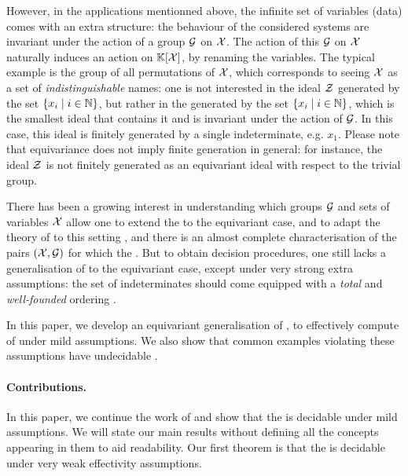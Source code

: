 \AP However, in the applications mentionned above, the infinite set of
variables (data) comes with an extra structure: the behaviour of the considered
systems are invariant under the action of a group $\mathcal{G}$ on $\mathcal{X}$. The action
of this $\mathcal{G}$ on $\mathcal{X}$ naturally induces an action on $\mathbb{K}[\mathcal{X}]$, by
renaming the variables. The typical example is the group of all permutations of
$\mathcal{X}$, which corresponds to seeing $\mathcal{X}$ as a set of \emph{indistinguishable}
names: one is not interested in the ideal $\mathcal{Z}$ generated by the set
$\{ x_i \mid i \in \mathbb{N} \}$, but rather in the  generated by
the set $\{ x_i \mid i \in \mathbb{N} \}$, which is the smallest ideal that contains it
and is invariant under the action of $\mathcal{G}$. In this case, this ideal is
finitely generated by a single indeterminate, e.g. $x_1$. Please note that
equivariance does not imply finite generation in general: for instance, the
ideal $\mathcal{Z}$ is not finitely generated as an equivariant ideal with respect to
the trivial group.

\AP There has been a growing interest in understanding which groups $\mathcal{G}$
and sets of variables $\mathcal{X}$ allow one to extend the 
to the equivariant case, and to adapt the theory of  to
this setting \cite{BRDR11,HISU12,HIKRLE18,GHOLAS24},
and there is an almost
complete characterisation of the pairs $(\mathcal{X},\mathcal{G})$ for which the
 \cite[Theorems 11 and 12]{GHOLAS24}.
But to obtain decision procedures, one still lacks a generalisation of
 to the equivariant case, except under very strong
extra assumptions: the set of indeterminates should come equipped with a
\emph{total} and \emph{well-founded} ordering \cite[Section 6]{GHOLAS24}.

\AP In this paper, we develop an equivariant generalisation of , to effectively compute  of  under mild assumptions. We also show that common examples violating
these assumptions have undecidable .

\paragraph{Contributions.} \AP In this paper, we continue the work of
\cite{GHOLAS24} and show that the  is
decidable under mild assumptions. We will state our main results without
defining all the concepts appearing in them to aid readability.
Our first theorem is that the  is decidable
under very weak effectivity assumptions.

